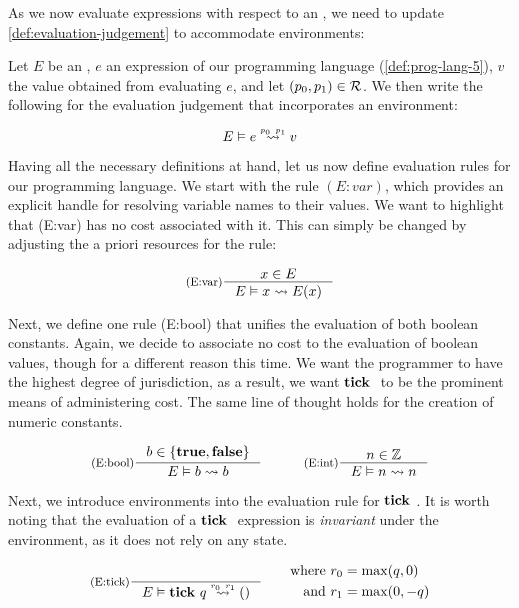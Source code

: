 As we now evaluate expressions with respect to an , we need to update \cref{def:evaluation-judgement} to accommodate environments:

\begin{definition}\label{def:eval-judgement-environments}
   Let \(E\) be an , \(e\) an expression of our programming language (\cref{def:prog-lang-5}), \(v\) the value obtained from evaluating \(e\), and let \((p_0, p_1) \in \mathcal{R}\). We then write the following for the evaluation judgement that incorporates an environment:

   \[
      \evals{E}{e}{v}{p_0}{p_1}
   \]
	
\end{definition}

Having all the necessary definitions at hand, let us now define evaluation rules for our programming language. We start with the rule \((E:var)\), which provides an explicit handle for resolving variable names to their values. We want to highlight that (E:var) has no cost associated with it. This can simply be changed by adjusting the a priori resources for the rule:

\[
   \inference[(E:var)]
   {\contains{E}{x}}
   {\evals{E}{x}{E(x)}{}{}}
\]

Next, we define one rule (E:bool) that unifies the evaluation of both boolean constants. Again, we decide to associate no cost to the evaluation of boolean values, though for a different reason this time. We want the programmer to have the highest degree of jurisdiction, as a result, we want \(\mathbf{tick}~\) to be the prominent means of administering cost. The same line of thought holds for the creation of numeric constants.

\[
   \inference[(E:bool)]{b \in \{\true, \false\}}{\evals{E}{b}{b}{}{}}%
   \quad\quad\quad
   \inference[(E:int)]{n \in \mathbb{Z}}{\evals{E}{n}{n}{}{}}
\]

Next, we introduce environments into the evaluation rule for \(\mathbf{tick}~\). It is worth noting that the evaluation of a \(\mathbf{tick}~\) expression is \emph{invariant} under the environment, as it does not rely on any state.

\[
   \inference[(E:tick)]
   {}
   {\evals{E}{\tick{q}}{()}{r_0}{r_1}}%
   \qquad 
   \begin{aligned}
      \text{where }  &r_0 = \max(q, 0)\\
      \text{and }    &r_1 = \max(0, -q) 
   \end{aligned}
\]

